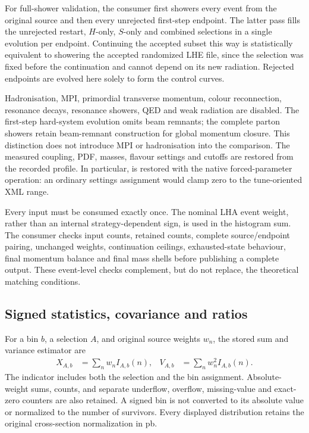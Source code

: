 For full-shower validation, the consumer first showers every event
from the original source and then every unrejected first-step
endpoint.  The latter pass fills the unrejected restart, \(H\)-only,
\(S\)-only and combined selections in a single evolution per endpoint.
Continuing the accepted subset this way is statistically equivalent
to showering the accepted randomized LHE file, since the selection was
fixed before the continuation and cannot depend on its new radiation.
Rejected endpoints are evolved here solely to form the control curves.

Hadronisation, MPI, primordial transverse momentum, colour
reconnection, resonance decays, resonance showers, QED and weak
radiation are disabled.  The first-step hard-system evolution omits
beam remnants; the complete parton showers retain beam-remnant
construction for global momentum closure.  This distinction does not
introduce MPI or hadronisation into the comparison.  The measured
coupling, PDF, masses, flavour settings and cutoffs are restored from
the recorded profile.  In particular,
 is restored with the native
forced-parameter operation: an ordinary settings assignment would
clamp zero to the tune-oriented XML range.

Every input must be consumed exactly once.  The nominal LHA event
weight, rather than an internal strategy-dependent sign, is used in
the histogram sum.  The consumer checks input counts, retained counts,
complete source/endpoint pairing, unchanged weights, continuation
ceilings, exhausted-state behaviour, final momentum balance and final
mass shells before publishing a complete output.  These event-level
checks complement, but do not replace, the theoretical matching
conditions.

\subsection{Signed statistics, covariance and ratios}
\label{sec:impl-statistics}

For a bin \(b\), a selection \(A\), and original source weights \(w_n\),
the stored sum and variance estimator are
\begin{align}
 X_{A,b}&=\sum_n w_n I_{A,b}(n),&
 V_{A,b}&=\sum_n w_n^2 I_{A,b}(n).
 \label{eq:impl-hist-sums}
\end{align}
The indicator includes both the selection and the bin assignment.
Absolute-weight sums, counts, and separate underflow, overflow,
missing-value and exact-zero counters are also retained.  A signed
bin is not converted to its absolute value or normalized to the
number of survivors.  Every displayed distribution retains the
original cross-section normalization in pb.

